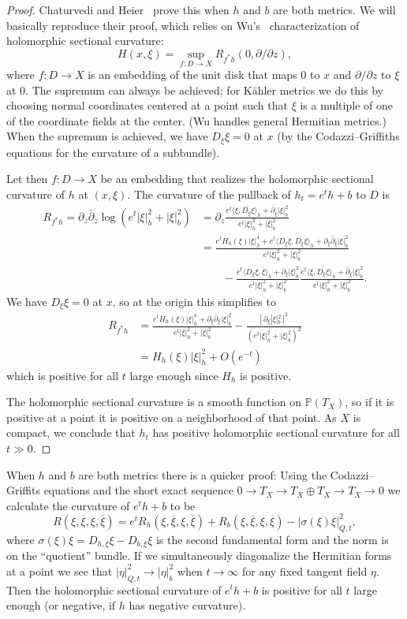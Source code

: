 \documentclass[10pt,a4paper]{amsart}
\newcommand{\kk}[1]{\mathbb{#1}}
\def\<{\langle}
\def\>{\rangle}
\def\ov#1{\overline{#1}}
\def\hsc{holomorphic sectional curvature}
\begin{document}
\begin{proof}
Chaturvedi and Heier~\cite{chaturvedi2020hermitian} prove this when $h$ and $b$
are both metrics.
We will basically reproduce their proof, which relies on
Wu's~\cite{wu1973remark} characterization of \hsc:
$$
H(x, \xi) = \sup_{f : D \to X} R_{f^*h}(0, \partial/\partial z),
$$
where $f : D \to X$ is an embedding of the unit disk that maps
$0$ to $x$ and $\partial/\partial z$ to $\xi$ at $0$.
The supremum can always be achieved; for K\"ahler metrics we do this by
choosing normal coordinates centered at a point such that $\xi$ is a multiple
of one of the coordinate fields at the center. (Wu handles general Hermitian
metrics.) When the supremum is achieved, we have $D_\xi \xi = 0$ at $x$ (by the
Codazzi--Griffiths equations for the curvature of a subbundle).

Let then $f : D \to X$ be an embedding that realizes the \hsc{} of $h$ at
$(x,\xi)$.
The curvature of the pullback of $h_t = e^t h + b$ to $D$ is
\begin{align*}
R_{f^*h}
= \partial_z \bar\partial_z \log(e^t |\xi|^2_h + |\xi|^2_b)
&= \partial_z \frac{e^t \<\xi, \ov{D_\xi\xi}\>_h + \bar\partial_\xi |\xi|^2_b}{e^t |\xi|^2_h + |\xi|^2_b}
\\
&= \frac{e^t H_h(\xi)|\xi|^4_h + e^t \<D_\xi \xi, \ov{D_\xi\xi}\>_h + \partial_\xi\bar\partial_\xi |\xi|^2_b}{e^t |\xi|^2_h + |\xi|^2_b}
\\
&\qquad
- \frac{e^t \<D_\xi \xi, \ov{\xi}\>_h + \partial_\xi |\xi|^2_b}{e^t |\xi|^2_h + |\xi|^2_b}
\frac{e^t \<\xi, \ov{D_\xi\xi}\>_h + \bar\partial_\xi |\xi|^2_b}{e^t |\xi|^2_h + |\xi|^2_b}.
\end{align*}
We have $D_\xi \xi = 0$ at $x$, so at the origin this simplifies to
\begin{align*}
R_{f^*h}
&= \frac{e^t H_h(\xi)|\xi|^4_h + \partial_\xi\bar\partial_\xi |\xi|^2_b}{e^t |\xi|^2_h + |\xi|^2_b}
- \frac{|\, \partial_\xi |\xi|^2_b \,|^2}{(e^t |\xi|^2_h + |\xi|^2_b)^2}
\\
&= H_h(\xi) |\xi|^2_h + O(e^{-t})
\end{align*}
which is positive for all $t$ large enough since $H_h$ is positive.

The \hsc{} is a smooth function on $\kk P(T_X)$, so if it is positive at a
point it is positive on a neighborhood of that point.
As $X$ is compact, we conclude that $h_t$ has positive \hsc{} for all $t \gg 0$.
\end{proof}


When $h$ and $b$ are both metrics there is a quicker proof:
Using the Codazzi--Griffits equations and the short exact sequence $0 \to T_X
\to T_X \oplus T_X \to T_X \to 0$ we calculate the curvature of $e^t h+b$ to be
$$
R(\xi, \ov\xi, \xi, \ov\xi)
= e^t R_h(\xi, \ov\xi, \xi, \ov\xi) + R_b(\xi, \ov\xi, \xi, \ov\xi)
- |\sigma(\xi)\xi|^2_{Q,t},
$$
where $\sigma(\xi)\xi = D_{h,\xi}\xi - D_{b,\xi} \xi$ is the second fundamental
form and the norm is on the ``quotient'' bundle.
If we simultaneously diagonalize the Hermitian forms at a point we see that
$|\eta|^2_{Q,t} \to |\eta|^2_b$ when $t \to \infty$ for any fixed tangent field
$\eta$. Then the \hsc{} of $e^t h + b$ is positive for all $t$ large enough (or
negative, if $h$ has negative curvature).
\end{document}
